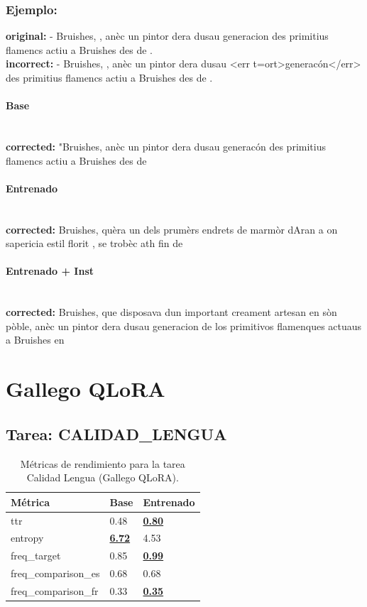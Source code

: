 \subsubsection{Ejemplo:}
\textbf{original:} - Bruishes, , anèc un pintor dera dusau generacion des primitius flamencs actiu a Bruishes des de .\\
\textbf{incorrect:} - Bruishes, , anèc un pintor dera dusau {\textless}err t=ort{\textgreater}generacón{\textless}/err{\textgreater} des primitius flamencs actiu a Bruishes des de .

\paragraph{Base}~\\
\textbf{corrected:} "Bruishes, anèc un pintor dera dusau generacón des primitius flamencs actiu a Bruishes des de

\paragraph{Entrenado}~\\
\textbf{corrected:} Bruishes, qu\textquotesingle{}èra un dels prumèrs endrets de marmòr d\textquotesingle{}Aran a on s\textquotesingle{}apericia estil florit , se trobèc ath fin de

\paragraph{Entrenado + Inst}~\\
\textbf{corrected:} Bruishes, que disposava d\textquotesingle{}un important creament artesan en sòn pòble, anèc un pintor dera dusau generacion de los primitivos flamenques actuaus a Bruishes en

\vspace{1em}

\section{Gallego QLoRA}

\subsection{Tarea: CALIDAD\_LENGUA}\label{tarea-calidad_lengua}
\begin{longtable}[]{@{}lll@{}}
\toprule\noalign{}
Métrica & Base & Entrenado \\
\midrule\noalign{}
\endhead
\bottomrule\noalign{}
\caption{Métricas de rendimiento para la tarea Calidad Lengua (Gallego QLoRA).}
\label{tab:metricas_calidad_lengua_Gallego QLoRA}
\endlastfoot
ttr & 0.48 & \textbf{\underline{0.80}} \\
entropy & \textbf{\underline{6.72}} & 4.53 \\
freq\_target & 0.85 & \textbf{\underline{0.99}} \\
freq\_comparison\_es & 0.68 & 0.68 \\
freq\_comparison\_fr & 0.33 & \textbf{\underline{0.35}} \\
\end{longtable}

